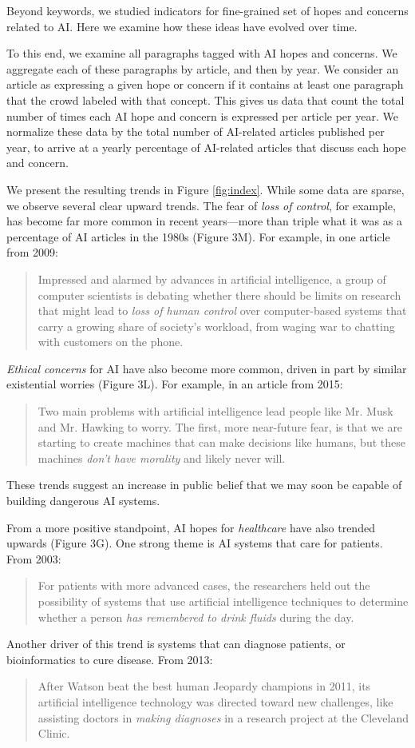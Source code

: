 \documentclass[letterpaper]{article}
\begin{document}
Beyond keywords, we studied indicators for fine-grained set of hopes and concerns related to AI. Here we examine how these ideas have evolved over time.

To this end, we examine all paragraphs tagged with AI hopes and concerns. We aggregate each of these paragraphs by article, and then by year. We consider an article as expressing a given hope or concern if it contains at least one paragraph that the crowd labeled with that concept. This gives us data that count the total number of times each AI hope and concern is expressed per article per year. We normalize these data by the total number of AI-related articles published per year, to arrive at a yearly percentage of AI-related articles that discuss each hope and concern.

We present the resulting trends in Figure \ref{fig:index}. While some data are sparse, we observe several clear upward trends. The fear of \textit{loss of control}, for example, has become far more common in recent years---more than triple what it was as a percentage of AI articles in the 1980s (Figure 3M). For example, in one article from 2009:
\begin{quote}
\small
Impressed and alarmed by advances in artificial intelligence, a group of computer scientists is debating whether there should be limits on research that might lead to \textit{loss of human control} over computer-based systems that carry a growing share of society's workload, from waging war to chatting with customers on the phone.
\normalsize
\end{quote}
\textit{Ethical concerns} for AI have also become more common, driven in part by similar existential worries (Figure 3L). For example, in an article from 2015:
\begin{quote}
\small
Two main problems with artificial intelligence lead people like Mr. Musk and Mr. Hawking to worry. The first, more near-future fear, is that we are starting to create machines that can make decisions like humans, but these machines \textit{don't have morality} and likely never will.
\normalsize
\end{quote}
These trends suggest an increase in public belief that we may soon be capable of building dangerous AI systems.

From a more positive standpoint, AI hopes for \textit{healthcare} have also trended upwards (Figure 3G). One strong theme is AI systems that care for patients. From 2003:
\begin{quote}
\small
For patients with more advanced cases, the researchers held out the possibility of systems that use artificial intelligence techniques to determine whether a person \textit{has remembered to drink fluids} during the day.
\normalsize
\end{quote}
Another driver of this trend is systems that can diagnose patients, or bioinformatics to cure disease. From 2013:
\begin{quote}
\small
After Watson beat the best human Jeopardy champions in 2011, its artificial intelligence technology was directed toward new challenges, like assisting doctors in \textit{making diagnoses} in a research project at the Cleveland Clinic.
\normalsize
\end{quote}
\end{document}

